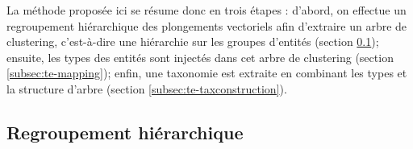 La méthode proposée ici se résume donc en trois étapes : d'abord, on effectue un regroupement hiérarchique des plongements vectoriels afin d'extraire un arbre de clustering, c'est-à-dire une hiérarchie sur les groupes d'entités (section \ref{subsec:te-clustering}); ensuite, les types des entités sont injectés dans cet arbre de clustering (section \ref{subsec:te-mapping}); enfin, une taxonomie est extraite en combinant les types et la structure d'arbre (section \ref{subsec:te-taxconstruction}). 






\subsection{Regroupement hiérarchique}
\label{subsec:te-clustering}

